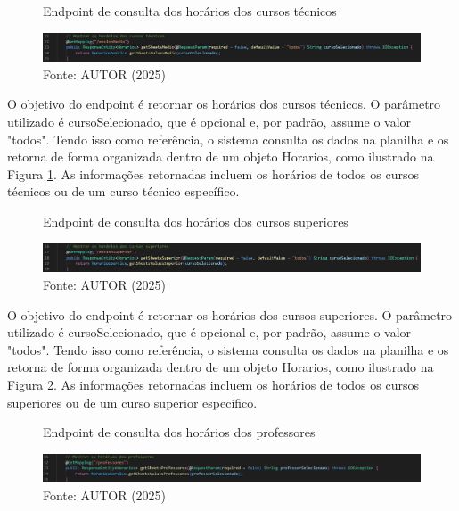 \begin{itemize}
    \begin{figure}[htb]
        \centering
        \caption{Endpoint de consulta dos horários dos cursos técnicos}
        \includegraphics[width=1\textwidth]{Figuras/back-3.png}
        \caption*{Fonte: AUTOR (2025)}
        \label{fig_back_3}
    \end{figure}

    O objetivo do endpoint é retornar os horários dos cursos técnicos. O parâmetro utilizado é cursoSelecionado, que é opcional e, por padrão, assume o valor "todos". Tendo isso como referência, o sistema consulta os dados na planilha e os retorna de forma organizada dentro de um objeto Horarios, como ilustrado na Figura \ref{fig_back_3}. As informações retornadas incluem os horários de todos os cursos técnicos ou de um curso técnico específico.

    \begin{figure}[htb]
        \centering
        \caption{Endpoint de consulta dos horários dos cursos superiores}
        \includegraphics[width=1\textwidth]{Figuras/back-4.png}
        \caption*{Fonte: AUTOR (2025)}
        \label{fig_back_4}
    \end{figure}

    O objetivo do endpoint é retornar os horários dos cursos superiores. O parâmetro utilizado é cursoSelecionado, que é opcional e, por padrão, assume o valor "todos". Tendo isso como referência, o sistema consulta os dados na planilha e os retorna de forma organizada dentro de um objeto Horarios, como ilustrado na Figura \ref{fig_back_4}. As informações retornadas incluem os horários de todos os cursos superiores ou de um curso superior específico.

    \begin{figure}[htb]
        \centering
        \caption{Endpoint de consulta dos horários dos professores}
        \includegraphics[width=1\textwidth]{Figuras/back-5.png}
        \caption*{Fonte: AUTOR (2025)}
        \label{fig_back_5}
    \end{figure}


\end{itemize}
